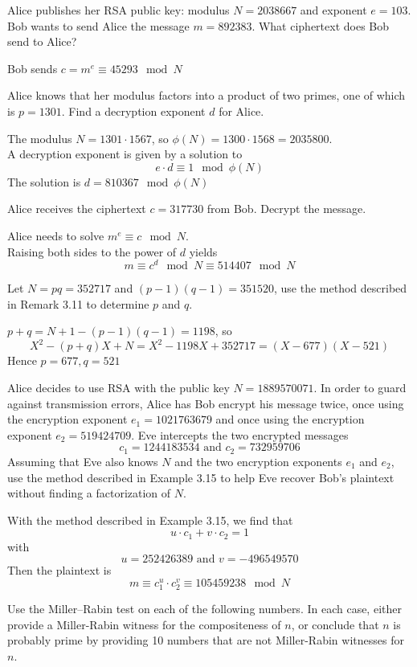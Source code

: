 \documentclass[12pt]{article}
\begin{document}
\thispagestyle{empty}

\problem Alice publishes her RSA public key: modulus $N=2038667$ and exponent $e=103$.\\
\subproblem Bob wants to send Alice the message $m=892383$. What ciphertext does Bob send to Alice?

\solution
Bob sends $c=m^e\equiv45293\mod{N}$

\subproblem Alice knows that her modulus factors into a product of two primes, one of which is $p=1301$. Find a decryption exponent $d$ for Alice.

\solution
The modulus $N=1301\cdot1567$, so $\phi(N)=1300\cdot1568=2035800$.\\
A decryption exponent is given by a solution to
\[e\cdot d\equiv 1\mod{\phi(N)}\]
The solution is $d=810367\mod{\phi(N)}$

\subproblem Alice receives the ciphertext $c=317730$ from Bob. Decrypt the message.

\solution
Alice needs to solve $m^e\equiv c\mod{N}$.\\
Raising both sides to the power of $d$ yields
\[m\equiv c^{d}\mod{N}\equiv 514407\mod{N}\]

\newpage
\problem Let $N=pq=352717$ and $(p-1)(q-1)=351520$, use the method described in Remark 3.11 to determine $p$ and $q$.

\solution
$p+q=N+1-(p-1)(q-1)=1198$, so
\[X^2-(p+q)X+N=X^2-1198X+352717=(X-677)(X-521)\]
Hence $p=677,q=521$

\problem Alice decides to use RSA with the public key $N=1889570071$. In order to guard against transmission errors, Alice has Bob encrypt his message twice, once using the encryption exponent $e_1= 1021763679$ and once using the encryption exponent $e_2=519424709$. Eve intercepts the two encrypted messages
\[c_1=1244183534 \text{ and } c_2=732959706\]
Assuming that Eve also knows $N$ and the two encryption exponents $e_1$ and $e_2$, use the method described in Example 3.15 to help Eve recover Bob’s plaintext without finding a factorization of $N$.

\solution
With the method described in Example 3.15, we find that
\[u\cdot c_1+v\cdot c_2=1\]
with
\[u= 252426389 \text{ and } v=-496549570\]
Then the plaintext is
\[m\equiv c_1^{u}\cdot c_2^{v}\equiv 105459238\mod{N}\]

\newpage
\problem Use the Miller–Rabin test on each of the following numbers. In each case, either provide a Miller-Rabin witness for the compositeness of $n$, or conclude that $n$ is probably prime by providing 10 numbers that are not Miller-Rabin witnesses for $n$.
\end{document}
